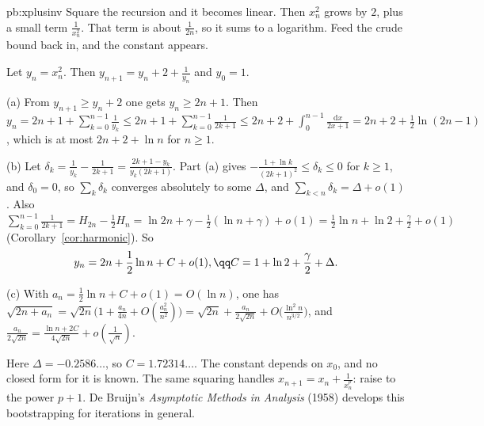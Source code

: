 \begin{solution}{pb:xplusinv}
\idea Square the recursion and it becomes linear. Then $x_n^2$ grows by $2$, plus a small term $\frac1{x_n^2}$. That term is about $\frac1{2n}$, so it sums to a logarithm. Feed the crude bound back in,
and the constant appears.

\writeup Let $y_n=x_n^2$. Then $y_{n+1}=y_n+2+\frac1{y_n}$ and $y_0=1$.

(a) From $y_{n+1}\ge y_n+2$ one gets $y_n\ge2n+1$. Then $y_n=2n+1+\sum_{k=0}^{n-1}\frac1{y_k}\le2n+1+\sum_{k=0}^{n-1}\frac1{2k+1}\le2n+2+\int_0^{n-1}\frac{\mathrm dx}{2x+1}=2n+2+\frac12\ln(2n-1)$, which is at most
$2n+2+\ln n$ for $n\ge1$.

(b) Let $\delta_k=\frac1{y_k}-\frac1{2k+1}=\frac{2k+1-y_k}{y_k(2k+1)}$. Part (a) gives $-\frac{1+\ln k}{(2k+1)^2}\le\delta_k\le0$ for $k\ge1$, and $\delta_0=0$, so $\sum_k\delta_k$ converges absolutely to some $\Delta$, and
$\sum_{k<n}\delta_k=\Delta+o(1)$. Also $\sum_{k=0}^{n-1}\frac1{2k+1}=H_{2n}-\frac12H_n=\ln2n+\gamma-\frac12(\ln n+\gamma)+o(1)=\frac12\ln n+\ln2+\frac\gamma2+o(1)$ (Corollary~\ref{cor:harmonic}). So
\[
y_n=2n+\frac12\ln n+C+o(1),\qq C=1+\ln2+\frac\gamma2+\Delta.
\]

(c) With $a_n=\frac12\ln n+C+o(1)=O(\ln n)$, one has $\sqrt{2n+a_n}=\sqrt{2n}\bigl(1+\frac{a_n}{4n}+O(\frac{a_n^2}{n^2})\bigr)=\sqrt{2n}+\frac{a_n}{2\sqrt{2n}}+O\bigl(\frac{\ln^2n}{n^{3/2}}\bigr)$, and $\frac{a_n}{2\sqrt{2n}}=\frac{\ln n+2C}{4\sqrt{2n}}+o(\frac1{\sqrt n})$.

\leads Here $\Delta=-0.2586\ldots$, so $C=1.72314\ldots$. The constant depends on $x_0$, and no closed form for it is known. The same squaring handles $x_{n+1}=x_n+\frac1{x_n^p}$: raise to the
power $p+1$. De Bruijn's \emph{Asymptotic Methods in Analysis} (1958) develops this bootstrapping for iterations in general.
\end{solution}

